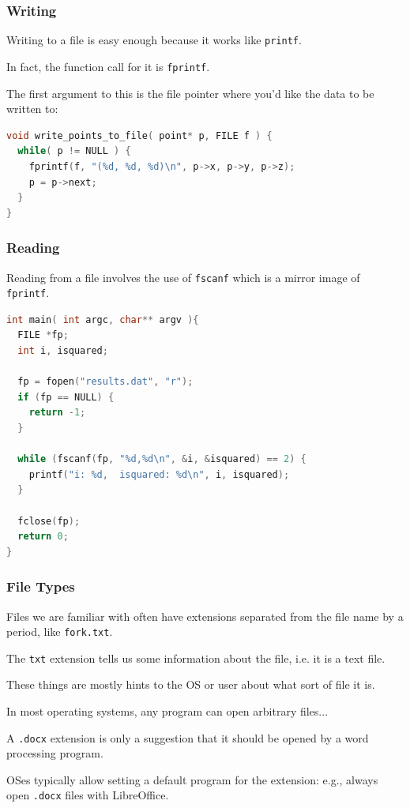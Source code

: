 \begin{frame}[fragile]
	\frametitle{Writing}

	Writing to a file is easy enough because it works like \texttt{printf}.

	In fact, the function call for it is \texttt{fprintf}.

	The first argument to this is the file pointer where you'd like the data to be written to:

	\begin{lstlisting}[language=C]
void write_points_to_file( point* p, FILE f ) {
  while( p != NULL ) {
    fprintf(f, "(%d, %d, %d)\n", p->x, p->y, p->z);
    p = p->next;
  }
}
\end{lstlisting}
\end{frame}


\begin{frame}[fragile]
	\frametitle{Reading}

	Reading from a file involves the use of \texttt{fscanf} which is a mirror image of \texttt{fprintf}.


	\begin{lstlisting}[language=C]
int main( int argc, char** argv ){
  FILE *fp;
  int i, isquared;
   
  fp = fopen("results.dat", "r");
  if (fp == NULL) {
    return -1;
  }
   
  while (fscanf(fp, "%d,%d\n", &i, &isquared) == 2) {
    printf("i: %d,  isquared: %d\n", i, isquared);
  }
  
  fclose(fp);
  return 0;
}
\end{lstlisting}

\end{frame}



\begin{frame}
	\frametitle{File Types}

	Files we are familiar with often have extensions separated from the file name by a period, like \texttt{fork.txt}.

	The \texttt{txt} extension tells us some information about the file, i.e. it is a text file.

	These things are mostly hints to the OS or user about what sort of file it is.

	In most operating systems, any program can open arbitrary files...

	A \texttt{.docx} extension is only a suggestion that it should be opened by a word processing program.

	OSes typically allow setting a default program for the extension: e.g., always open \texttt{.docx} files with LibreOffice.


\end{frame}

